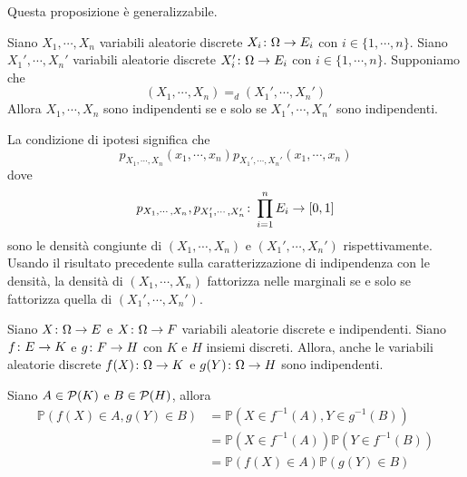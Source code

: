 \documentclass[a4paper]{article}
\begin{document}
Questa proposizione è generalizzabile.

\begin{snippetproposition}{}
    Siano \(X_1, \cdots, X_n\) variabili aleatorie discrete
    \(X_i \colon \Omega \to E_i\) con \(i \in \{1, \cdots, n\}\).
    Siano \(X_1', \cdots, X_n'\) variabili aleatorie discrete
    \(X_i' \colon \Omega \to E_i\) con \(i \in \{1, \cdots, n\}\).
    Supponiamo che
    \[
        (X_1, \cdots, X_n) =_d (X_1', \cdots, X_n')
    \]
    Allora \(X_1, \cdots, X_n\) sono indipendenti se e solo se
    \(X_1', \cdots, X_n'\) sono indipendenti.
\end{snippetproposition}

\begin{snippetproof}{}
    La condizione di ipotesi significa che
    \[
        p_{X_1, \cdots, X_n}(x_1, \cdots, x_n)
        p_{X_1', \cdots, X_n'}(x_1, \cdots, x_n)
    \]
    dove
    \[
        p_{X_1, \cdots, X_n},p_{X_1', \cdots, X_n'}
        \colon
        \prod_{i=1}^n E_i \to [0,1]
    \]
    sono le densità congiunte di \((X_1, \cdots, X_n)\)
    e \((X_1', \cdots, X_n')\) rispettivamente.
    Usando il risultato precedente %
    sulla caratterizzazione di indipendenza con le densità,
    la densità di \((X_1, \cdots, X_n)\) fattorizza
    nelle marginali se e solo se fattorizza
    quella di \((X_1', \cdots, X_n')\).
\end{snippetproof}

\begin{snippetproposition}{}
    Siano \(X \colon \Omega \to E\)
    e \(X \colon \Omega \to F\) variabili aleatorie discrete e indipendenti.
    Siano \(f \colon E \to K\) e \(g \colon F \to H\)
    con \(K\) e \(H\) insiemi discreti.
    Allora, anche le variabili aleatorie discrete
    \(f(X) \colon \Omega \to K\) e \(g(Y) \colon \Omega \to H\)
    sono indipendenti.
\end{snippetproposition}

\begin{snippetproof}{}
    Siano \(A \in \mathcal P(K)\)
    e \(B \in \mathcal P(H)\), allora
    \begin{align*}
        \mathbb P(f(X) \in A, g(Y) \in B)
        &= \mathbb P(X \in f^{-1}(A), Y \in g^{-1}(B)) \\
        &= \mathbb P(X \in f^{-1}(A)) \mathbb P(Y \in f^{-1}(B)) \\
        &= \mathbb P(f(X) \in A) \mathbb P(g(Y) \in B)
    \end{align*}
\end{snippetproof}
\end{document}
